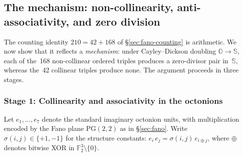 

\subsection{The mechanism: non-collinearity, anti-associativity, and zero
division}\label{sec:mechanism}

The counting identity $210 = 42 + 168$ of \S\ref{sec:fano-counting} is
arithmetic.  We now show that it reflects a \emph{mechanism}: under
Cayley–Dickson doubling $\mathbb{O}\to\mathbb{S}$, each of the~168
non-collinear ordered triples produces a zero-divisor pair in~$\mathbb{S}$,
whereas the~42 collinear triples produce none.  The argument proceeds in
three stages.

\subsubsection*{Stage 1: Collinearity and associativity in the octonions}

Let $e_1,\dots,e_7$ denote the standard imaginary octonion units, with
multiplication encoded by the Fano plane $\mathrm{PG}(2,2)$ as in
\S\ref{sec:fano}.  Write $\sigma(i,j)\in\{+1,-1\}$ for the structure
constants: $e_i\,e_j = \sigma(i,j)\,e_{i\oplus j}$, where $\oplus$
denotes bitwise XOR in $\mathbb{F}_2^3\setminus\{0\}$.

